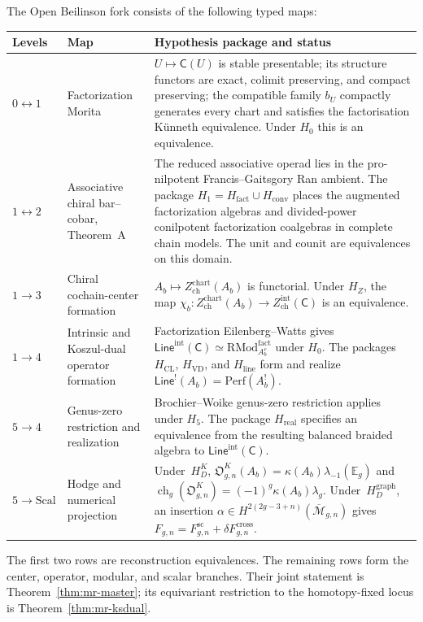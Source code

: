 \begin{convention}
\label{conv:master-reconstruction-tower}
The Open Beilinson fork consists of the following typed maps:
\begin{center}
\renewcommand{\arraystretch}{1.35}
\begin{tabular}{|p{1.7cm}|p{4.5cm}|p{7.7cm}|}
\hline
\textbf{Levels} & \textbf{Map} & \textbf{Hypothesis package and status} \\
\hline\hline
$0\leftrightarrow1$ &
Factorization Morita &
$U\mapsto\mathsf C(U)$ is stable presentable; its structure functors
are exact, colimit preserving, and compact preserving; the compatible
family $b_U$ compactly generates every chart and satisfies the
factorisation K\"unneth equivalence.  Under $H_0$ this is an
equivalence. \\
\hline
$1\leftrightarrow2$ &
Associative chiral bar--cobar, Theorem~A &
The reduced associative operad lies in the pro-nilpotent
Francis--Gaitsgory Ran ambient.  The package
$H_1=H_{\mathrm{fact}}\cup H_{\mathrm{conv}}$ places the augmented
factorization algebras and divided-power conilpotent factorization
coalgebras in complete chain models.  The unit and counit are
equivalences on this domain.\\
\hline
$1\to3$ &
Chiral cochain-center formation &
$A_b\mapsto Z_{\mathrm{ch}}^{\mathrm{chart}}(A_b)$ is functorial.
Under $H_Z$, the map
$\chi_b\colon Z_{\mathrm{ch}}^{\mathrm{chart}}(A_b)\to
Z_{\mathrm{ch}}^{\mathrm{int}}(\mathsf C)$ is an equivalence. \\
\hline
$1\to4$ &
Intrinsic and Koszul-dual operator formation &
Factorization Eilenberg--Watts gives
$\mathsf{Line}^{\mathrm{int}}(\mathsf C)\simeq
\mathrm{RMod}^{\mathrm{fact}}_{A_b^e}$ under $H_0$.
The packages $H_{\mathrm{CL}}$, $H_{\mathrm{VD}}$, and
$H_{\mathrm{line}}$ form and realize
$\mathsf{Line}^{!}(A_b)=\mathrm{Perf}(A_b^!)$. \\
\hline
$5\to4$ &
Genus-zero restriction and realization &
Brochier--Woike genus-zero restriction applies under $H_5$.
The package $H_{\mathrm{real}}$ specifies an equivalence from the
resulting balanced braided algebra to
$\mathsf{Line}^{\mathrm{int}}(\mathsf C)$. \\
\hline
$5\to\mathrm{Scal}$ &
Hodge and numerical projection &
Under~$H_D^K$,
$\mathfrak O^K_{g,n}(A_b)=\kappa(A_b)\lambda_{-1}(\mathbb E_g)$ and
$\operatorname{ch}_g(\mathfrak O^K_{g,n})
=(-1)^g\kappa(A_b)\lambda_g$.  Under~$H_D^{\mathrm{graph}}$, an
insertion
$\alpha\in H^{2(2g-3+n)}(\overline{\mathcal M}_{g,n})$ gives
$F_{g,n}=F^{\mathrm{sc}}_{g,n}+\delta F^{\mathrm{cross}}_{g,n}$. \\
\hline
\end{tabular}
\end{center}
The first two rows are reconstruction equivalences.  The remaining
rows form the center, operator, modular, and scalar branches.  Their
joint statement is Theorem~\ref{thm:mr-master}; its equivariant
restriction to the homotopy-fixed locus is
Theorem~\ref{thm:mr-ksdual}.
\end{convention}

